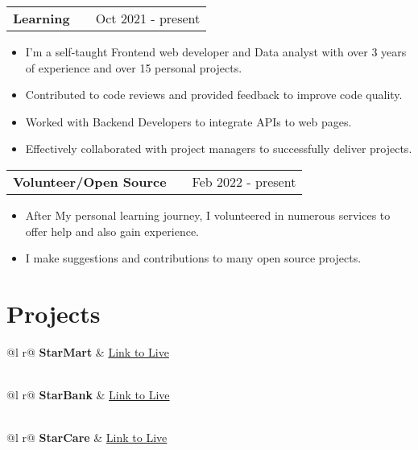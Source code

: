 \documentclass[a4paper,12pt]{article}
\makeatletter
\newenvironment{joblong}[2]
    {
    \begin{tabularx}{\linewidth}{@{}l X r@{}}
    \textbf{#1} & \hfill &  #2 \\[3.75pt]
    \end{tabularx}
    \begin{minipage}[t]{\linewidth}
    \begin{itemize}[nosep,after=\strut, leftmargin=1em, itemsep=3pt,label=--]
    }
    {
    \end{itemize}
    \end{minipage}    
    }
\makeatother
\begin{document}
\begin{joblong}{Learning}{Oct 2021 - present}
\item I'm a self-taught Frontend web developer and Data analyst with over 3 years of experience and over 15 personal projects. 
\item Contributed to code reviews and provided feedback to improve code quality.
\item Worked with Backend Developers to integrate APIs to web pages.
\item Effectively collaborated with project managers to successfully deliver projects.
\end{joblong}

\begin{joblong}{Volunteer/Open Source}{Feb 2022 - present}
\item After My personal learning journey, I volunteered in numerous services to offer help and also gain experience.
\item I make suggestions and contributions to many open source projects. 
\end{joblong}

\section{Projects}

\begin{tabularx}{\linewidth}{ @{}l r@{} }
\textbf{StarMart} & \hfill \href{https://harbystardev.github.io/StarMart/}{Link to Live} \\[3.75pt]
  \\
\end{tabularx}

\begin{tabularx}{\linewidth}{ @{}l r@{} }
\textbf{StarBank} & \hfill \href{https://harbystardev.github.io/StarBank/}{Link to Live} \\[3.75pt]
  \\
\end{tabularx}

\begin{tabularx}{\linewidth}{ @{}l r@{} }
\textbf{StarCare} & \hfill \href{https://harbystardev.github.io/StarCare/}{Link to Live} \\[3.75pt]
  \\
\end{tabularx}
\end{document}
